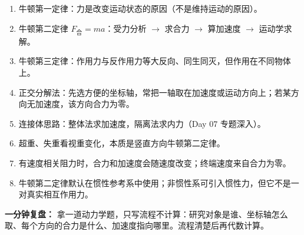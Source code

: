 {\small
\begin{enumerate}[nosep,leftmargin=2em]
  \item 牛顿第一定律：力是改变运动状态的原因（不是维持运动的原因）。
  \item 牛顿第二定律 $F_{\text{合}} = ma$：受力分析 $\to$ 求合力 $\to$ 算加速度 $\to$ 运动学求解。
  \item 牛顿第三定律：作用力与反作用力等大反向、同生同灭，但作用在不同物体上。
  \item 正交分解法：先选方便的坐标轴，常把一轴取在加速度或运动方向上；若某方向无加速度，该方向合力为零。
  \item 连接体思路：整体法求加速度，隔离法求内力（Day 07 专题深入）。
  \item 超重、失重看视重变化，本质是竖直方向牛顿第二定律。
  \item 有速度相关阻力时，合力和加速度会随速度改变；终端速度来自合力为零。
  \item 牛顿第二定律默认在惯性参考系中使用；非惯性系可引入惯性力，但它不是一对真实相互作用力。
\end{enumerate}

\textbf{一分钟复盘：} 拿一道动力学题，只写流程不计算：研究对象是谁、坐标轴怎么取、每个方向的合力是什么、加速度指向哪里。流程清楚后再代数计算。
}
